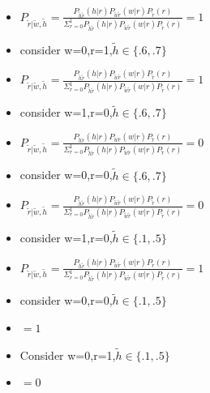 \documentclass[12pt,twoside]{article}
\begin{document}
\begin{enumerate}
\begin{enumerate}
\begin{itemize}
     \item $P_{\tilde{r}|\tilde{w},\tilde{h}}=\frac{P_{\tilde{h}\tilde{r}}(h|r)P_{\tilde{w}\tilde{r}}(w|r)P_{\tilde{r}}(r)}{\Sigma_{r=0}^{1}P_{\tilde{h}\tilde{r}}(h|r)P_{\tilde{w}\tilde{r}}(w|r)P_{\tilde{r}}(r)}=1$
     \item consider w=0,r=1,$\tilde{h}\in\{.6,.7\}$
     \item $P_{\tilde{r}|\tilde{w},\tilde{h}}=\frac{P_{\tilde{h}\tilde{r}}(h|r)P_{\tilde{w}\tilde{r}}(w|r)P_{\tilde{r}}(r)}{\Sigma_{r=0}^{1}P_{\tilde{h}\tilde{r}}(h|r)P_{\tilde{w}\tilde{r}}(w|r)P_{\tilde{r}}(r)}=1$
     \item consider w=1,r=0,$\tilde{h}\in\{.6,.7\}$
     \item $P_{\tilde{r}|\tilde{w},\tilde{h}}=\frac{P_{\tilde{h}\tilde{r}}(h|r)P_{\tilde{w}\tilde{r}}(w|r)P_{\tilde{r}}(r)}{\Sigma_{r=0}^{1}P_{\tilde{h}\tilde{r}}(h|r)P_{\tilde{w}\tilde{r}}(w|r)P_{\tilde{r}}(r)}=0$
     \item consider w=0,r=0,$\tilde{h}\in\{.6,.7\}$
     \item $P_{\tilde{r}|\tilde{w},\tilde{h}}=\frac{P_{\tilde{h}\tilde{r}}(h|r)P_{\tilde{w}\tilde{r}}(w|r)P_{\tilde{r}}(r)}{\Sigma_{r=0}^{1}P_{\tilde{h}\tilde{r}}(h|r)P_{\tilde{w}\tilde{r}}(w|r)P_{\tilde{r}}(r)}=0$
          \item consider w=1,r=0,$\tilde{h}\in\{.1,.5\}$
     \item $P_{\tilde{r}|\tilde{w},\tilde{h}}=\frac{P_{\tilde{h}\tilde{r}}(h|r)P_{\tilde{w}\tilde{r}}(w|r)P_{\tilde{r}}(r)}{\Sigma_{r=0}^{1}P_{\tilde{h}\tilde{r}}(h|r)P_{\tilde{w}\tilde{r}}(w|r)P_{\tilde{r}}(r)}=1$
     \item consider w=0,r=0,$\tilde{h}\in\{.1,.5\}$
     \item $=1$
     
     \item Consider w=0,r=1,$\tilde{h}\in\{.1,.5\}$
     \item $=0$
     

\end{itemize}
\end{enumerate}
\end{enumerate}
\end{document}
